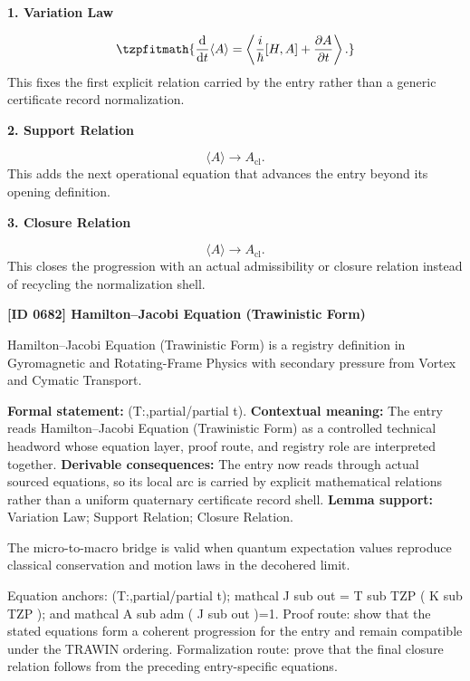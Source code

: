 \noindent\textbf{1. Variation Law}\par
\[
\tzpfitmath{\frac{\mathrm{d}}{\mathrm{d}t}\langle A\rangle = \left\langle \frac{i}{\hbar}[H,A] + \frac{\partial A}{\partial t} \right\rangle.}
\]
\noindent This fixes the first explicit relation carried by the entry rather than a generic certificate record normalization.\par
\noindent\textbf{2. Support Relation}\par
\[
\langle A\rangle \longrightarrow A_{\mathrm{cl}}.
\]
\noindent This adds the next operational equation that advances the entry beyond its opening definition.\par
\noindent\textbf{3. Closure Relation}\par
\[
\langle A\rangle \rightarrow A_{\mathrm{cl}}.
\]
\noindent This closes the progression with an actual admissibility or closure relation instead of recycling the normalization shell.\par

\clearpage
\noindent\textbf{[ID 0682] Hamilton--Jacobi Equation (Trawinistic Form)}\par
\vspace{0.35em}
\begingroup\small
{}
Hamilton--Jacobi Equation (Trawinistic Form) is a registry definition in Gyromagnetic and Rotating-Frame Physics with secondary pressure from Vortex and Cymatic Transport.

\begingroup\footnotesize\setlength{\emergencystretch}{3em}\sloppy
\textbf{Formal statement:} (T:,partial/partial t). \textbf{Contextual meaning:} The entry reads Hamilton--Jacobi Equation (Trawinistic Form) as a controlled technical headword whose equation layer, proof route, and registry role are interpreted together. \textbf{Derivable consequences:} The entry now reads through actual sourced equations, so its local arc is carried by explicit mathematical relations rather than a uniform quaternary certificate record shell. \textbf{Lemma support:} Variation Law; Support Relation; Closure Relation.\par
\endgroup

The micro-to-macro bridge is valid when quantum expectation values reproduce classical conservation and motion laws in the decohered limit.

Equation anchors: (T:,partial/partial t); mathcal J sub out = T sub TZP ( K sub TZP ); and mathcal A sub adm ( J sub out )=1. Proof route: show that the stated equations form a coherent progression for the entry and remain compatible under the TRAWIN ordering. Formalization route: prove that the final closure relation follows from the preceding entry-specific equations.

